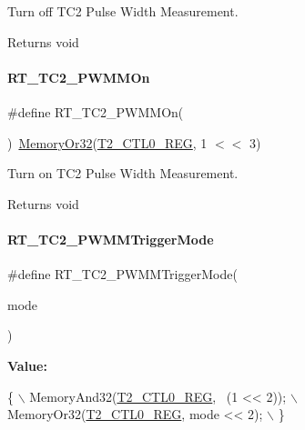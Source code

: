 Turn off T\+C2 Pulse Width Measurement. 

\begin{DoxyReturn}{Returns}
void 
\end{DoxyReturn}
\mbox{\label{a00083_a37ffb0b466d2a13bb9917a818b06776b}} 
\paragraph{\texorpdfstring{R\+T\+\_\+\+T\+C2\+\_\+\+P\+W\+M\+M\+On}{RT\_TC2\_PWMMOn}}
{\footnotesize\ttfamily \#define R\+T\+\_\+\+T\+C2\+\_\+\+P\+W\+M\+M\+On(\begin{DoxyParamCaption}{ }\end{DoxyParamCaption})~\mbox{\hyperlink{a00026_a27874a97deab7cecdde5ddecf466e31e}{Memory\+Or32}}(\mbox{\hyperlink{a00026_a5853553391e986211306d4f29ab31e47}{T2\+\_\+\+C\+T\+L0\+\_\+\+R\+EG}}, 1 $<$$<$ 3)}



Turn on T\+C2 Pulse Width Measurement. 

\begin{DoxyReturn}{Returns}
void 
\end{DoxyReturn}
\mbox{\label{a00083_a80f5ade258504a1243ccb058dd860475}} 
\paragraph{\texorpdfstring{R\+T\+\_\+\+T\+C2\+\_\+\+P\+W\+M\+M\+Trigger\+Mode}{RT\_TC2\_PWMMTriggerMode}}
{\footnotesize\ttfamily \#define R\+T\+\_\+\+T\+C2\+\_\+\+P\+W\+M\+M\+Trigger\+Mode(\begin{DoxyParamCaption}\item[{}]{mode }\end{DoxyParamCaption})}

{\bfseries Value\+:}
\begin{DoxyCode}
\{                                        \(\backslash\)
        MemoryAnd32(\mbox{\hyperlink{a00026_a5853553391e986211306d4f29ab31e47}{T2\_CTL0\_REG}}, ~(1 << 2)); \(\backslash\)
        MemoryOr32(\mbox{\hyperlink{a00026_a5853553391e986211306d4f29ab31e47}{T2\_CTL0\_REG}}, mode << 2);  \(\backslash\)
    \}
\end{DoxyCode}


